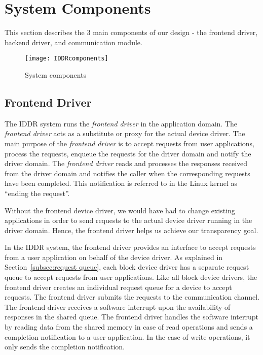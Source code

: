 \section{System Components}\label{components}

This section describes the 3 main components of our design 
- the frontend driver, backend driver, and communication module.

\begin{figure}[!ht]
\centering
\texttt{[image: IDDRcomponents]}
\caption{System components}
\label{fig:Design Evo1}
\end{figure}

\subsection{Frontend Driver}
\label{subsec:frontend}

The IDDR system runs the \textit{frontend
driver} in the application domain. The \textit{frontend driver} acts
as a substitute or proxy for the actual device driver. The main purpose of the
\textit{frontend driver} is to accept requests from user applications,
process the requests, enqueue the requests for the driver domain and
notify the driver domain. The \textit{frontend driver} reads and processes
the responses received from the driver domain and notifies the caller
when the corresponding requests have been completed.  This notification
is referred to in the Linux kernel as ``ending the request''.

Without the frontend device driver, we would have had to change
existing applications in order to send requests to the actual device
driver running in the driver domain. Hence, the
frontend driver helps us achieve our transparency goal.

In the IDDR system, the frontend driver provides an interface to accept
requests from a user application on behalf of the device driver. 
As explained in Section~\ref{subsec:request queue}, each block device
driver has a separate request queue to accept requests from user
applications. Like all block device drivers, the frontend driver
creates an individual request queue for a device to accept requests.
The frontend driver submits the requests to the
communication channel. The frontend driver receives a software interrupt
upon the availability of responses in the shared queue. The frontend
driver handles the software interrupt by reading data from the shared
memory in case of read operations and sends a completion notification to
a user application.  In the case of write operations, it only sends the
completion notification.

